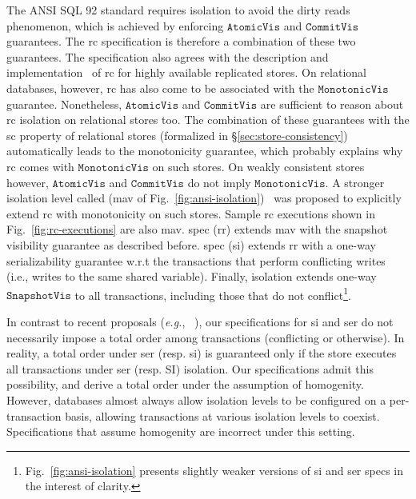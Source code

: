 The ANSI SQL 92 standard requires  isolation to
avoid the dirty reads phenomenon, which is achieved by enforcing
$\mathtt{AtomicVis}$ and $\mathtt{CommitVis}$ guarantees. The {\sc rc}
specification is therefore a combination of these two guarantees. The
specification also agrees with the description and
implementation~\cite{bailishat,pldi15} of {\sc rc} for highly
available replicated stores. On relational databases, however, {\sc
rc} has also come to be associated with the $\mathtt{MonotonicVis}$
guarantee.  Nonetheless, $\mathtt{AtomicVis}$ and $\mathtt{CommitVis}$
are sufficient to reason about {\sc rc} isolation on relational stores
too. The combination of these guarantees with the {\sc sc} property of
relational stores (formalized in \S\ref{sec:store-consistency})
automatically leads to the monotonicity guarantee, which probably
explains why {\sc rc} comes with $\mathtt{MonotonicVis}$ on such
stores. On weakly consistent stores however, $\mathtt{AtomicVis}$ and
$\mathtt{CommitVis}$ do not imply $\mathtt{MonotonicVis}$. A stronger
isolation level called  ({\sc mav} of
Fig.~\ref{fig:ansi-isolation})~\cite{bailishat,pldi15} was proposed to
explicitly extend {\sc rc} with monotonicity on such stores. Sample
{\sc rc} executions shown in Fig.~\ref{fig:rc-executions} are also
{\sc mav}.  spec ({\sc rr}) extends {\sc mav}
with the snapshot visibility guarantee as described before.
 spec ({\sc si}) extends {\sc rr} with a
one-way serializability guarantee w.r.t the transactions that perform
conflicting writes (i.e., writes to the same shared variable).
Finally,  isolation extends one-way
$\mathtt{SnapshotVis}$ to all transactions, including those that do
not conflict\footnote{Fig.~\ref{fig:ansi-isolation} presents slightly
weaker versions of {\sc si} and {\sc ser} specs in the interest of
clarity.}. 

In contrast to recent proposals (\emph{e.g.},
~\cite{gotsmanconcur15}), our specifications for {\sc si} and {\sc
  ser} do not necessarily impose a total order among transactions
(conflicting or otherwise). In reality, a total order under {\sc ser}
(resp. {\sc si}) is guaranteed only if the store executes all
transactions under {\sc ser} (resp. {\sc SI}) isolation. Our
specifications admit this possibility, and derive a total order under
the assumption of homogenity. However, databases almost always allow
isolation levels to be configured on a per-transaction basis, allowing
transactions at various isolation levels to coexist.  Specifications
that assume homogenity are incorrect under this setting.


